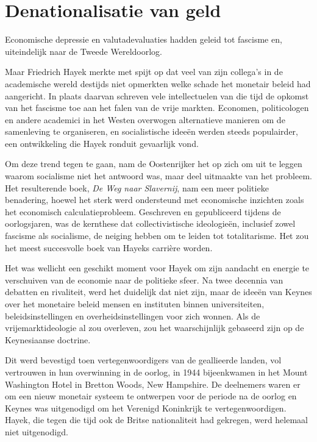 \documentclass[
  a5paper,
  smalldemyvopaper,11pt,twoside,onecolumn,openright,extrafontsizes,
hidelinks]{memoir}
\begin{document}
\chapter{Denationalisatie van geld}\label{denationalisatie-van-geld}

Economische depressie en valutadevaluaties hadden geleid tot fascisme
en, uiteindelijk naar de Tweede Wereldoorlog.

Maar Friedrich Hayek merkte met spijt op dat veel van zijn collega's in
de academische wereld destijds niet opmerkten welke schade het monetair
beleid had aangericht. In plaats daarvan schreven vele intellectuelen
van die tijd de opkomst van het fascisme toe aan het falen van de vrije
markten. Economen, politicologen en andere academici in het Westen
overwogen alternatieve manieren om de samenleving te organiseren, en
socialistische ideeën werden steeds populairder, een ontwikkeling die
Hayek ronduit gevaarlijk vond.

Om deze trend tegen te gaan, nam de Oostenrijker het op zich om uit te
leggen waarom socialisme niet het antwoord was, maar deel uitmaakte van
het probleem. Het resulterende boek, \emph{De Weg naar Slavernij}, nam
een meer politieke benadering, hoewel het sterk werd ondersteund met
economische inzichten zoals het economisch calculatieprobleem.
Geschreven en gepubliceerd tijdens de oorlogsjaren, was de kernthese dat
collectivistische ideologieën, inclusief zowel fascisme als socialisme,
de neiging hebben om te leiden tot totalitarisme. Het zou het meest
succesvolle boek van Hayeks carrière worden.

Het was wellicht een geschikt moment voor Hayek om zijn aandacht en
energie te verschuiven van de economie naar de politieke sfeer. Na twee
decennia van debatten en rivaliteit, werd het duidelijk dat niet zijn,
maar de ideeën van Keynes over het monetaire beleid mensen en instituten
binnen universiteiten, beleidsinstellingen en overheidsinstellingen voor
zich wonnen. Als de vrijemarktideologie al zou overleven, zou het
waarschijnlijk gebaseerd zijn op de Keynesiaanse doctrine.

Dit werd bevestigd toen vertegenwoordigers van de geallieerde landen,
vol vertrouwen in hun overwinning in de oorlog, in 1944 bijeenkwamen in
het Mount Washington Hotel in Bretton Woods, New Hampshire. De
deelnemers waren er om een nieuw monetair systeem te ontwerpen voor de
periode na de oorlog en Keynes was uitgenodigd om het Verenigd
Koninkrijk te vertegenwoordigen. Hayek, die tegen die tijd ook de Britse
nationaliteit had gekregen, werd helemaal niet uitgenodigd.
\end{document}
